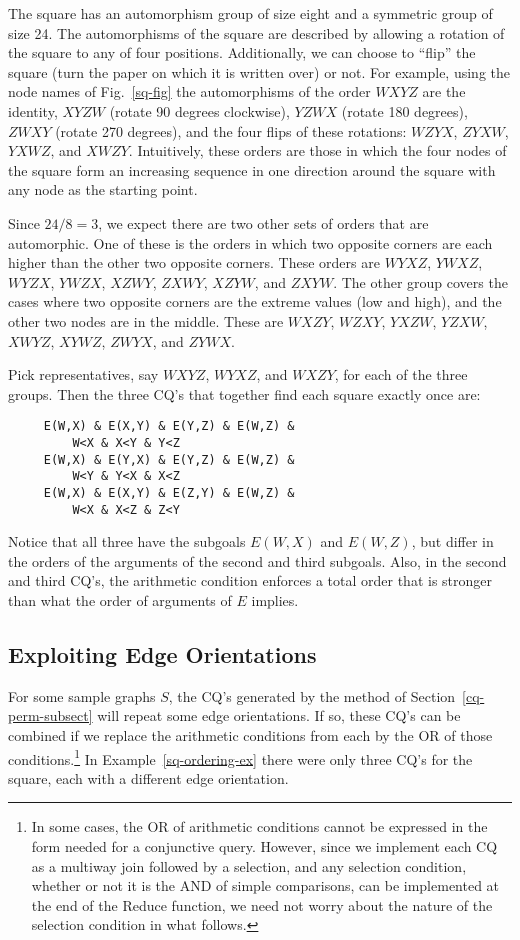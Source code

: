 \begin{example}\label{sq-ordering-ex}
The square has an automorphism group of size eight and a symmetric group of size 24.
The automorphisms of the square are described by allowing a rotation of the square to any of four positions.  Additionally, we can choose to ``flip'' the square (turn the paper on which it is written over) or not.  For example, using the node names of Fig.~\ref{sq-fig} the automorphisms of the order $WXYZ$ are the identity, $XYZW$ (rotate 90 degrees clockwise), $YZWX$ (rotate 180 degrees), $ZWXY$ (rotate 270 degrees), and the four flips of these rotations: $WZYX$, $ZYXW$, $YXWZ$, and $XWZY$.  Intuitively, these orders are those in which the four nodes of the square form an increasing sequence in one direction around the square with any node as the starting point.

Since $24/8=3$, we expect there are two other sets of orders that are automorphic.  One of these is the orders in which two opposite corners are each higher than the other two opposite corners.  These orders are $WYXZ$, $YWXZ$, $WYZX$, $YWZX$, $XZWY$, $ZXWY$, $XZYW$, and $ZXYW$.  The other group covers the cases where two opposite corners are the extreme values (low and high), and the other two nodes are in the middle.  These are $WXZY$, $WZXY$, $YXZW$, $YZXW$, $XWYZ$, $XYWZ$, $ZWYX$, and $ZYWX$.

Pick representatives, say $WXYZ$, $WYXZ$, and $WXZY$, for each of the three groups.  Then the three CQ's that together find each square exactly once are:

\begin{verbatim}
     E(W,X) & E(X,Y) & E(Y,Z) & E(W,Z) &
         W<X & X<Y & Y<Z
     E(W,X) & E(Y,X) & E(Y,Z) & E(W,Z) &
         W<Y & Y<X & X<Z
     E(W,X) & E(X,Y) & E(Z,Y) & E(W,Z) &
         W<X & X<Z & Z<Y
\end{verbatim}
Notice that all three have the subgoals $E(W,X)$ and $E(W,Z)$, but differ in the orders of the arguments of the second and third subgoals.  Also, in the second and third CQ's, the arithmetic condition enforces a total order that is stronger than what the order of arguments of $E$ implies.
\end{example}

\subsection{Exploiting Edge Orientations}
\label{edge-orient-subsect}

For some sample graphs $S$, the CQ's generated by the method of Section~\ref{cq-perm-subsect} will repeat some edge orientations.  If so, these CQ's can be combined if we replace the arithmetic conditions from each by the OR of those conditions.\footnote{In some cases, the OR of arithmetic conditions cannot be expressed in the form needed for a conjunctive query.  However, since we implement each CQ as a multiway join followed by a selection, and any selection condition, whether or not it is the AND of simple comparisons, can be implemented at the end of the Reduce function, we need not worry about the nature of the selection condition in what follows.}
In Example~\ref{sq-ordering-ex} there were only three CQ's for the square, each with a different edge orientation.

